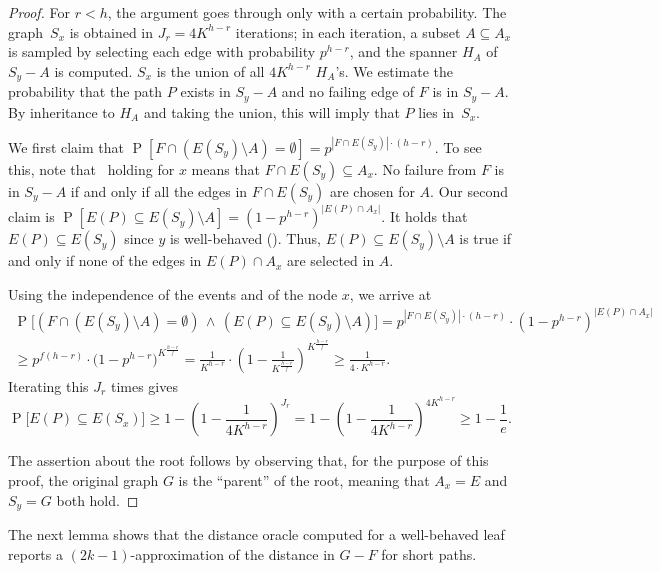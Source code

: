 \documentclass{theoretics}
\DeclareMathOperator{\Pb}{P}
\renewcommand{\ge}{\geqslant}
\begin{document}
\begin{proof}
  For $r < h$, the argument goes through only with a certain probability.
  The graph~$S_x$ is obtained in $J_r = 4 K^{h-r}$ iterations;
  in each iteration, a subset $A \subseteq A_x$ is sampled
  by selecting each edge with probability $p^{h-r}$,
  and the spanner $H_A$ of $S_y{-}A$ is computed.
  $S_x$ is the union of all $4 K^{h-r}$ $H_A$'s.
  We estimate the probability that the path 
  $P$ exists in $S_y{-}A$ 
  and no failing edge of $F$ is in $S_y{-}A$.
  By inheritance to $H_A$ and taking the union,
  this will imply that $P$ lies in~$S_x$.
  
  We first claim that $\Pb[F\cap (E(S_y){\setminus}A)=\emptyset] = p^{|F\cap E(S_y)| \cdot (h-r)}$.
  To see this, note that~ holding for $x$ means that $F\cap E(S_y)\subseteq A_x$.
  No failure from $F$ is in $S_y{-}A$ if and only if all the edges in $F\cap E(S_y)$
  are chosen for $A$. 
  Our second claim is $\Pb[E(P) \subseteq E(S_y){\setminus}A] = (1-p^{h-r})^{|E(P) \cap A_x|}$.
  It holds that $E(P)\subseteq E(S_y)$ since $y$ is well-behaved ().
  Thus, $E(P)\subseteq E(S_y){\setminus}A$ is true
  if and only if none of the edges in $E(P)\cap A_x$ are selected in $A$.
  
  Using the independence of the events and  of the node $x$,
  we arrive at
  \begin{multline*}
    \Pb\!\Big[ (F \cap (E(S_y){\setminus}A)=\emptyset) \,\wedge\,
      (E(P) \subseteq E(S_y){\setminus}A) \Big]
      = p^{|F\cap E(S_y)| \cdot (h-r)} \cdot (1-p^{h-r})^{|E(P) \cap A_x|}\\[-.33em]
      \ge  p^{f(h-r)} \cdot \Big(1-p^{h-r} \Big)^{K^{\frac{h-r}{f}}}
       =  \frac{1}{K^{h-r}} \cdot \left( 1-\frac{1}{K^{\frac{h-r}{f}}} \right)^{K^{\frac{h-r}{f}}}
      \ge \frac{1}{4 \cdot K^{h-r}}.
  \end{multline*}
  Iterating this $J_r$ times gives
  \begin{equation*}
    \Pb\!\big[E(P) \subseteq E(S_x)\big] 
      \ge 1-\left(1-\frac{1}{4K^{h-r}}\right)^{J_r}
      = 1-\left(1-\frac{1}{4K^{h-r}}\right)^{4K^{h-r}}
      \ge 1-\frac{1}{e}.
  \end{equation*}
  
  The assertion about the root follows
  by observing that, for the purpose of this proof, the original graph $G$ is the ``parent''
  of the root, meaning that $A_x = E$ and $S_y = G$ both hold.
\end{proof}

The next lemma shows that the distance oracle computed for a well-behaved leaf
reports a $(2k{-}1)$-approximation of the distance in $G-F$ for short paths. 
\end{document}
